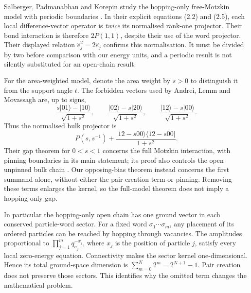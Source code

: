 \documentclass[11pt,a4paper]{article}
\theoremstyle{remark}\newtheorem{remark}[theorem]{Remark}
\newcommand{\ket}[1]{\lvert #1\rangle}
\newcommand{\bra}[1]{\langle #1\rvert}
\begin{document}
Salberger, Padmanabhan and Korepin study the hopping-only free-Motzkin model with periodic boundaries \cite{FreeMotzkin}. In their explicit equations (2.2) and (2.5), each local difference-vector operator is \emph{twice} its normalised rank-one projector. Their bond interaction is therefore $2P(1,1)$, despite their use of the word projector. Their displayed relation $\widehat e_j^2=2\widehat e_j$ confirms this normalisation. It must be divided by two before comparison with our energy units, and a periodic result is not silently substituted for an open-chain result.

For the area-weighted model, denote the area weight by $s>0$ to distinguish it from the support angle $t$. The forbidden vectors used by Andrei, Lemm and Movassagh are, up to signs,
\[
 \frac{s\ket{01}-\ket{10}}{\sqrt{1+s^2}},\qquad
 \frac{\ket{02}-s\ket{20}}{\sqrt{1+s^2}},\qquad
 \frac{\ket{12}-s\ket{00}}{\sqrt{1+s^2}}.
\]
Thus the normalised bulk projector is
\begin{equation}\label{eq:motzkindecomposition}
 P(s,s^{-1})+\frac{\ket{12-s00}\bra{12-s00}}{1+s^2}.
\end{equation}
Their gap theorem for $0<s<1$ concerns the full Motzkin interaction, with pinning boundaries in its main statement; its proof also controls the open unpinned bulk chain \cite{ALM}. Our opposing-bias theorem instead concerns the first summand alone, without either the pair-creation term or pinning. Removing these terms enlarges the kernel, so the full-model theorem does not imply a hopping-only gap.

In particular the hopping-only open chain has one ground vector in each conserved particle-word sector. For a fixed word $\sigma_1\cdots\sigma_m$, any placement of its ordered particles can be reached by hopping through vacancies. The amplitudes proportional to $\prod_{j=1}^m q_{\sigma_j}^{-x_j}$, where $x_j$ is the position of particle $j$, satisfy every local zero-energy equation. Connectivity makes the sector kernel one-dimensional. Hence its total ground-space dimension is $\sum_{m=0}^N2^m=2^{N+1}-1$. Pair creation does not preserve those sectors. This identifies why the omitted term changes the mathematical problem.
\end{document}
